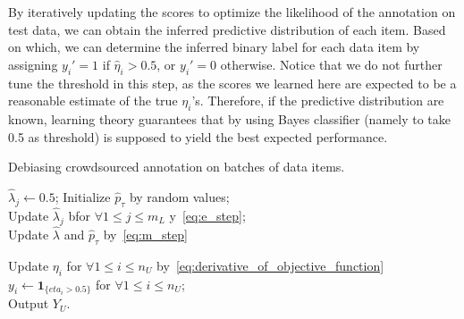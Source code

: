 By iteratively updating the scores to optimize the likelihood of the annotation on test data, 
we can obtain the inferred predictive distribution of each item.  
Based on which, we can determine the inferred binary label for each data item by assigning $y_i'=1$ if $\hat{\eta}_i > 0.5$, 
or $y_i'=0$ otherwise.  
Notice that we do not further tune the threshold in this step, 
as the scores we learned here are expected to be a reasonable estimate of the true $\eta_i$'s. 
Therefore, if the predictive distribution are known, 
learning theory guarantees that by using Bayes classifier (namely to take 0.5 as threshold) 
is supposed to yield the best expected performance.  




\incmargin{1em}
\begin{algorithm}[!t]
       \caption{Debiasing crowdsourced annotation on batches of data items.}\label{alg:debias}
\small

       \BlankLine
       $\hat{\lambda}_j \leftarrow 0.5$; 
       Initialize $\hat{p}_{\tau}$ by random values; \\
       {
           Update $\hat{\lambda}_j$ bfor $\forall 1 \leq j \leq m_L$ y~\eqref{eq:e_step}; \\
           Update $\hat{\lambda}$ and $\hat{p}_{\tau}$ by~\eqref{eq:m_step}
       }

       {
           Update $\eta_i$ for $\forall 1 \leq i \leq n_U$ by~\eqref{eq:derivative_of_objective_function}
       }
       $y_i \leftarrow \mathbf{1}_{\{eta_i > 0.5\}}$ for $\forall 1 \leq i \leq n_U$; \\
       Output $Y_U$.
\end{algorithm}
\normalsize
\decmargin{1em}


